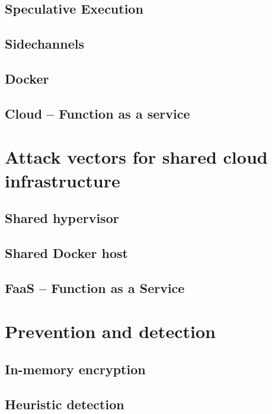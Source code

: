 \documentclass[conference,compsoc,final,a4paper]{IEEEtran}
\begin{document}
\subsection{Speculative Execution}

\subsection{Sidechannels}

\subsection{Docker}

\subsection{Cloud -- Function as a service}

\section{Attack vectors for shared cloud infrastructure}

\subsection{Shared hypervisor}

\subsection{Shared Docker host}

\subsection{FaaS -- Function as a Service}

\section{Prevention and detection}
\subsection{In-memory encryption}
\subsection{Heuristic detection}
\end{document}
